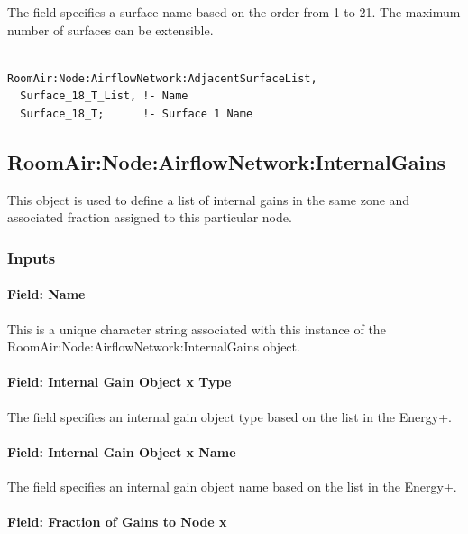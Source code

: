 The field specifies a surface name based on the order from 1 to 21. The maximum number of surfaces can be extensible.

\begin{lstlisting}

RoomAir:Node:AirflowNetwork:AdjacentSurfaceList,
  Surface_18_T_List, !- Name
  Surface_18_T;      !- Surface 1 Name
\end{lstlisting}

\subsection{RoomAir:Node:AirflowNetwork:InternalGains}\label{roomairnodeairflownetworkinternalgains}

This object is used to define a list of internal gains in the same zone and associated fraction assigned to this particular node.

\subsubsection{Inputs}\label{inputs-14-012}

\paragraph{Field: Name}\label{field-name-10-014}

This is a unique character string associated with this instance of the RoomAir:Node:AirflowNetwork:InternalGains object.

\paragraph{Field: Internal Gain Object x Type}\label{field-internal-gain-object-x-type}

The field specifies an internal gain object type based on the list in the Energy+.

\paragraph{Field: Internal Gain Object x Name}\label{field-internal-gain-object-x-name}

The field specifies an internal gain object name based on the list in the Energy+.

\paragraph{Field: Fraction of Gains to Node x}\label{field-fraction-of-gains-to-node-x}


